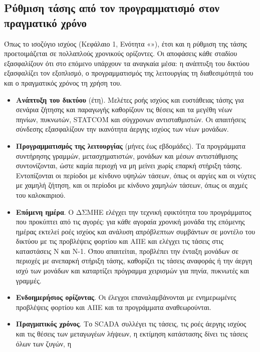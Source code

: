 \subsection{Ρύθμιση τάσης από τον προγραμματισμό στον πραγματικό χρόνο}
\label{sec:v-stages}

Όπως το ισοζύγιο ισχύος (Κεφάλαιο 1, Ενότητα «»), έτσι και η ρύθμιση της
τάσης προετοιμάζεται σε πολλαπλούς χρονικούς ορίζοντες. Οι αποφάσεις κάθε σταδίου εξασφαλίζουν
ότι στο επόμενο υπάρχουν τα αναγκαία μέσα: η ανάπτυξη του δικτύου εξασφαλίζει τον εξοπλισμό, ο
προγραμματισμός της λειτουργίας τη διαθεσιμότητά του και ο πραγματικός χρόνος τη χρήση του.

\begin{itemize}
\item \textbf{Ανάπτυξη του δικτύου} (έτη). Μελέτες ροής ισχύος και ευστάθειας τάσης για
      σενάρια ζήτησης και παραγωγής καθορίζουν τις θέσεις και τα μεγέθη νέων πηνίων, πυκνωτών,
      STATCOM και σύγχρονων αντισταθμιστών. Οι απαιτήσεις σύνδεσης εξασφαλίζουν την ικανότητα
      άεργης ισχύος των νέων μονάδων.
\item \textbf{Προγραμματισμός της λειτουργίας} (μήνες έως εβδομάδες). Τα προγράμματα
      συντήρησης γραμμών, μετασχηματιστών, μονάδων και μέσων αντιστάθμισης συντονίζονται,
      ώστε καμία περιοχή να μη μείνει χωρίς επαρκή στήριξη τάσης. Εντοπίζονται οι περίοδοι με
      κίνδυνο υψηλών τάσεων, όπως οι αργίες και οι νύχτες με χαμηλή ζήτηση, και οι περίοδοι με
      κίνδυνο χαμηλών τάσεων, όπως οι αιχμές του καλοκαιριού.
\item \textbf{Επόμενη ημέρα}. Ο ΔΣΜΗΕ ελέγχει την τεχνική εφικτότητα του προγράμματος που
      προκύπτει από τις αγορές: για κάθε αγοραία χρονική μονάδα της επόμενης ημέρας εκτελεί
      ροές ισχύος και ανάλυση απρόβλεπτων συμβάντων σε μοντέλο του δικτύου με τις προβλέψεις φορτίου
      και ΑΠΕ και ελέγχει τις τάσεις στις καταστάσεις N και N-1. Όπου απαιτείται, προβλέπει την
      ένταξη μονάδων σε περιοχές με ανεπαρκή στήριξη τάσης, καθορίζει τις τάσεις αναφοράς ή την
      άεργη ισχύ των μονάδων και καταρτίζει πρόγραμμα χειρισμών για πηνία, πυκνωτές και
      γραμμές.
\item \textbf{Ενδοημερήσιος ορίζοντας}. Οι έλεγχοι επαναλαμβάνονται με ενημερωμένες
      προβλέψεις φορτίου και ΑΠΕ και τα προγράμματα αναθεωρούνται.
\item \textbf{Πραγματικός χρόνος}. Το SCADA συλλέγει τις τάσεις, τις ροές άεργης ισχύος και τις
      θέσεις των μεταγωγέων λήψεων, η εκτίμηση κατάστασης δίνει τις τάσεις όλων των ζυγών, η

\end{itemize}
